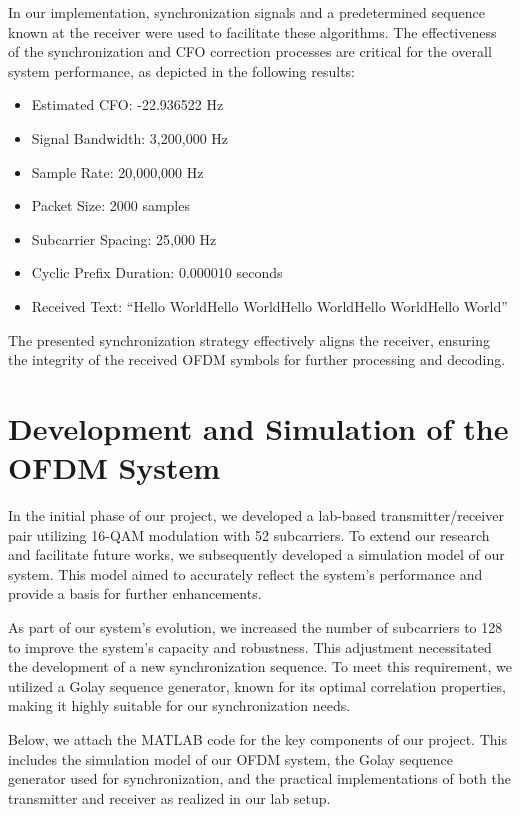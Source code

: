 \documentclass{article}
\begin{document}
In our implementation, synchronization signals and a predetermined sequence known at the receiver were used to facilitate these algorithms. The effectiveness of the synchronization and CFO correction processes are critical for the overall system performance, as depicted in the following results:

\begin{itemize}
    \item Estimated CFO: -22.936522 Hz
    \item Signal Bandwidth: 3,200,000 Hz
    \item Sample Rate: 20,000,000 Hz
    \item Packet Size: 2000 samples
    \item Subcarrier Spacing: 25,000 Hz
    \item Cyclic Prefix Duration: 0.000010 seconds
    \item Received Text: ``Hello WorldHello WorldHello WorldHello WorldHello World''
\end{itemize}

The presented synchronization strategy effectively aligns the receiver, ensuring the integrity of the received OFDM symbols for further processing and decoding.


\section*{Development and Simulation of the OFDM System}

In the initial phase of our project, we developed a lab-based transmitter/receiver pair utilizing 16-QAM modulation with 52 subcarriers. To extend our research and facilitate future works, we subsequently developed a simulation model of our system. This model aimed to accurately reflect the system's performance and provide a basis for further enhancements.

As part of our system's evolution, we increased the number of subcarriers to 128 to improve the system's capacity and robustness. This adjustment necessitated the development of a new synchronization sequence. To meet this requirement, we utilized a Golay sequence generator, known for its optimal correlation properties, making it highly suitable for our synchronization needs.

Below, we attach the MATLAB code for the key components of our project. This includes the simulation model of our OFDM system, the Golay sequence generator used for synchronization, and the practical implementations of both the transmitter and receiver as realized in our lab setup.
\end{document}
